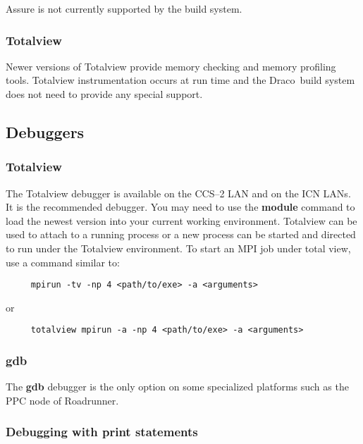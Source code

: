 \documentclass[11pt]{nmemo}
\newcommand{\draco}{{\normalfont\sffamily Draco}}
\begin{document}
Assure is not currently supported by the build system.


\subsubsection{Totalview}

Newer versions of Totalview provide memory checking and memory
profiling tools.  Totalview instrumentation occurs at run time and the
\draco\ build system does not need to provide any special support.



\subsection{Debuggers}

\subsubsection{Totalview}

The Totalview debugger is available on the CCS--2 LAN and on the ICN
LANs.  It is the recommended debugger.  You may need to use the
\textbf{module} command to load the newest version into your current
working environment.  Totalview can be used to attach to a running
process or a new process can be started and directed to run under the
Totalview environment.  To start an MPI job under total view, use a
command similar to:
\footnotesize
\begin{verbatim}
     mpirun -tv -np 4 <path/to/exe> -a <arguments>
\end{verbatim}
\normalsize
or
\footnotesize
\begin{verbatim}
     totalview mpirun -a -np 4 <path/to/exe> -a <arguments>
\end{verbatim}
\normalsize

\subsubsection{gdb}

The \textbf{gdb} debugger is the only option on some specialized
platforms such as the PPC node of Roadrunner.

\subsubsection{Debugging with print statements}
\end{document}
